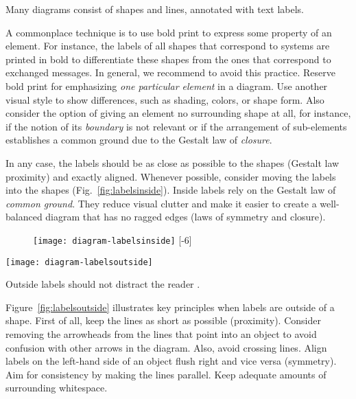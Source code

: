 Many diagrams consist of shapes and lines, annotated with text labels.

A commonplace technique is to use bold print to express some property of an element. For instance, the labels of all shapes that correspond to systems are printed in bold to differentiate these shapes from the ones that correspond to exchanged  messages. In general, we recommend to avoid this practice. Reserve bold print for emphasizing \emph{one particular element} in a diagram. Use another visual style to show differences, such as shading, colors, or shape form. Also consider the option of giving an element no surrounding shape at all, for instance, if the notion of its \emph{boundary} is not relevant or if the arrangement of sub-elements establishes a common ground due to the Gestalt law of \emph{closure}.

In any case, the labels should be as close as possible to the shapes (Gestalt law proximity) and exactly aligned. Whenever possible, consider moving the labels into the shapes (Fig.~\ref{fig:labelsinside}). Inside labels rely on the Gestalt law of \emph{common ground}. They reduce visual clutter and make it easier to create a well-balanced diagram that has no ragged edges (laws of symmetry and closure). 

\begin{figure}[t]
\centering
\texttt{[image: diagram-labelsinside]}
[-6\baselineskip]
\end{figure}

\begin{marginfigure}
\centering
\texttt{[image: diagram-labelsoutside]}
\caption{\label{fig:labelsoutside} Outside labels should not distract the reader \cite{Carter12}.}%
\end{marginfigure}

Figure~\ref{fig:labelsoutside} illustrates key principles when labels are outside of a shape. First of all, keep the lines as short as possible (proximity). Consider removing the arrowheads from the lines that point into an object to avoid confusion with other arrows in the diagram. Also, avoid crossing lines. Align labels on the left-hand side of an object flush right and vice versa (symmetry). Aim for consistency by making the lines parallel. Keep adequate amounts of surrounding whitespace.

